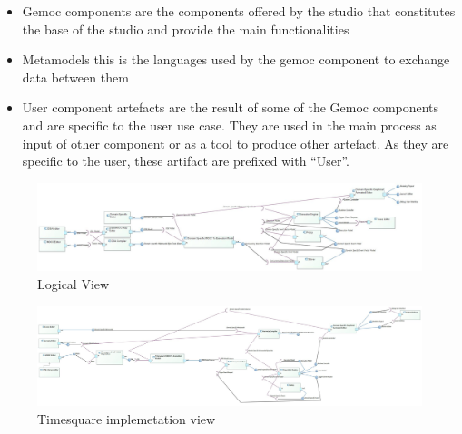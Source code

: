\documentclass{gemoc} %
\begin{document}
\begin{itemize}
	\item Gemoc components are the components offered by the studio that constitutes the base of the studio and provide the main functionalities
	\item Metamodels this is the languages used by the gemoc component to exchange data between them
	\item User component artefacts are the result of some of the Gemoc components and are specific to the user use case. They are used in the main process as input of other component or as a tool to produce other artefact. As they are specific to the user, these artifact are prefixed with ``User''.
\end{itemize}

\begin{figure}[bt]
	\begin{center}
	\includegraphics*[trim=0.0cm 0.0cm 0cm 0.0cm, clip=true, angle=90, totalheight=0.9\textheight]{../images/Logical View.jpg}
	\caption{Logical View}
	\label{fig:LogicalView}
	\end{center}
\end{figure}
\begin{figure}[bt]
	\begin{center}
	\includegraphics*[trim=0.0cm 0.0cm 0cm 0.0cm, clip=true, angle=90, totalheight=0.9\textheight]{../images/TimesquareImplementation.jpg}
	\caption{Timesquare implemetation view}
	\label{fig:TimesquareImplementation}
	\end{center}
\end{figure}
\end{document}
